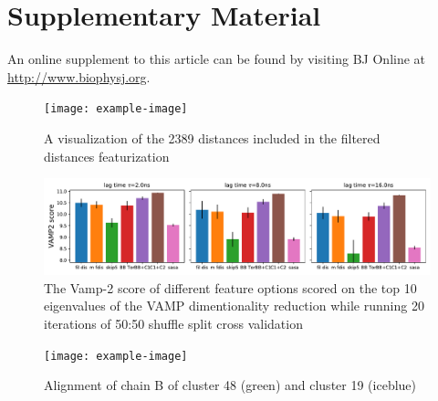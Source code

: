 \documentclass{biophys-new}
\begin{document}
\section*{Supplementary Material}

An online supplement to this article can be found by visiting BJ Online at \url{http://www.biophysj.org}.

\begin{figure}[ht]
\centering
\texttt{[image: example-image]}
\caption{A visualization of the 2389 distances included in the filtered distances featurization}
\label{fig:view}
\end{figure}

\begin{figure}[h]
\centering
\graphicspath{ {./supplemental_figures/} }
\includegraphics[width=0.6\linewidth]{sup_fig_2vamp_score_10dim_20splits_both_3_zoom.pdf}
\caption{The Vamp-2 score of different feature options scored on the top 10 eigenvalues of the VAMP dimentionality reduction while running 20 iterations of 50:50 shuffle split cross validation}
\label{fig:view}
\end{figure}

\begin{figure}  %
\centering
\graphicspath{ {./supplemental_figures/} }
\texttt{[image: example-image]}
\caption{Alignment of chain B of cluster 48 (green) and cluster 19 (iceblue)}
\label{fig:view}
\end{figure}
\end{document}
